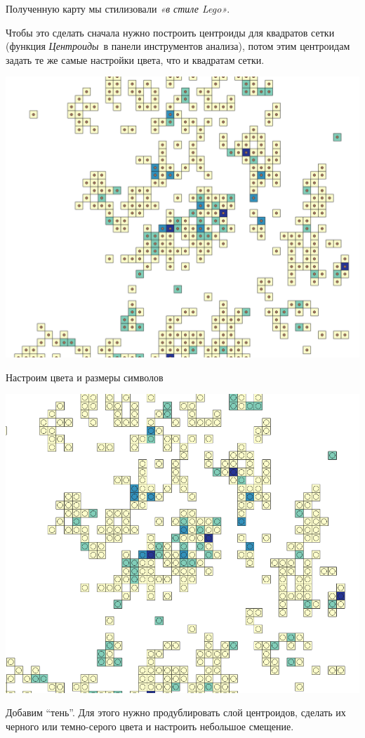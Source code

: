 \documentclass[
]{book}
\begin{document}
Полученную карту мы стилизовали \emph{«в стиле Lego»}.

Чтобы это сделать сначала нужно построить центроиды для квадратов сетки (функция \emph{Центроиды}~в панели инструментов анализа), потом этим центроидам задать те же самые настройки цвета, что и квадратам сетки.

\includegraphics{figures/24.png}

Настроим цвета и размеры символов

\includegraphics{figures/25.png}

Добавим ``тень''. Для этого нужно продублировать слой центроидов, сделать их черного или темно-серого цвета и настроить небольшое смещение.
\end{document}

